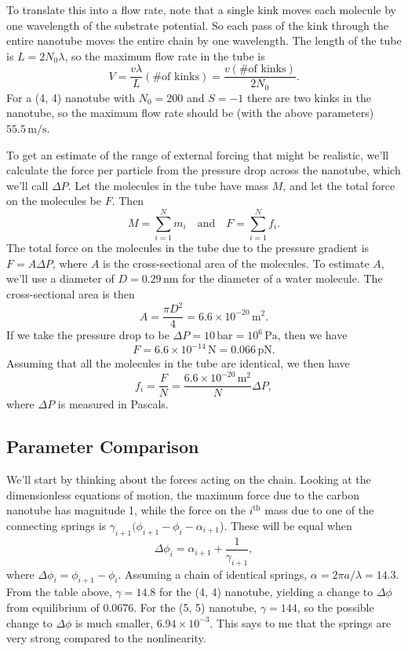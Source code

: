 \documentclass[11pt]{article}
\begin{document}
To translate this into a flow rate, note that a single kink moves each molecule by one wavelength of the substrate potential. So each pass of the kink through the entire nanotube moves the entire chain by one wavelength. The length of the tube is $L=2N_0\lambda$, so the maximum flow rate in the tube is
\[
V = \frac{v\lambda}{L}(\text{\# of kinks})
	= \frac{v(\text{\# of kinks})}{2N_0}.
\]
For a (4, 4) nanotube with $N_0=200$ and $S=-1$ there are two kinks in the nanotube, so the maximum flow rate should be (with the above parameters) $55.5\,\text{m}/\text{s}$.

To get an estimate of the range of external forcing that might be realistic, we'll calculate the force per particle from the pressure drop across the nanotube, which we'll call $\Delta P$. Let the molecules in the tube have mass $M$, and let the total force on the molecules be $F$. Then
\[
M=\sum_{i=1}^N m_i\quad\text{and}\quad F=\sum_{i=1}^N f_i.
\]
The total force on the molecules in the tube due to the pressure gradient is $F=A\Delta P$, where $A$ is the cross-sectional area of the molecules. To estimate $A$, we'll use a diameter of $D=0.29\,\text{nm}$ for the diameter of a water molecule. The cross-sectional area is then
\[
A=\frac{\pi D^2}{4}=6.6\times10^{-20}\,\text{m}^2.
\]
If we take the pressure drop to be $\Delta P=10\,\text{bar}=10^6\,\text{Pa}$, then we have
\[
F=6.6\times10^{-14}\,\text{N}=0.066\,\text{pN}.
\]
Assuming that all the molecules in the tube are identical, we then have
\[
f_i=\frac{F}{N}=\frac{6.6\times10^{-20}\,\text{m}^2}{N}\Delta P,
\]
where $\Delta P$ is measured in Pascals.

\subsection{Parameter Comparison}

We'll start by thinking about the forces acting on the chain. Looking at the dimensionless equations of motion, the maximum force due to the carbon nanotube has magnitude 1, while the force on the $i^\text{th}$ mass due to one of the connecting springs is $\gamma_{i+1}(\phi_{i+1}-\phi_i-\alpha_{i+1}$). These will be equal when
\[
\Delta\phi_i=\alpha_{i+1}+\frac{1}{\gamma_{i+1}},
\]
where $\Delta\phi_i=\phi_{i+1}-\phi_i$. Assuming a chain of identical springs, $\alpha=2\pi a/\lambda=14.3$. From the table above, $\gamma=14.8$ for the (4, 4) nanotube, yielding a change to $\Delta\phi$ from equilibrium of 0.0676. For the (5, 5) nanotube, $\gamma=144$, so the possible change to $\Delta\phi$ is much smaller, $6.94\times10^{-3}$. This says to me that the springs are very strong compared to the nonlinearity.
\end{document}
